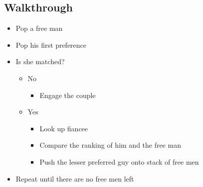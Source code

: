 \documentclass{tufte-handout}
\begin{document}
  \subsection{Walkthrough}

  \begin{itemize}
  \item Pop a free man
  \item Pop his first preference
  \item Is she matched?
    \begin{itemize}
    \item[] No
    \begin{itemize}
    \item Engage the couple
    \end{itemize}
    \item[] Yes 
      \begin{itemize}
        \item Look up fiancee
        \item Compare the ranking of him and the free man
        \item Push the lesser preferred guy onto stack of free men  
      \end{itemize}
    \end{itemize}
    \item Repeat until there are no free men left
  \end{itemize}
\end{document}
